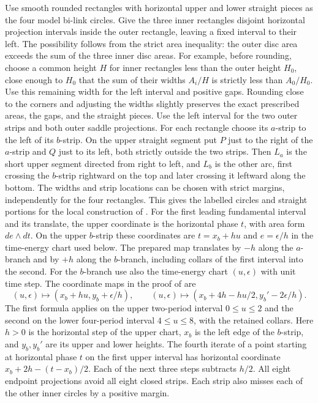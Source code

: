 \documentclass[11pt]{article}
\begin{document}
Use smooth rounded rectangles with horizontal upper and lower straight pieces as
the four model bi-link circles. Give the three inner rectangles disjoint
horizontal projection intervals inside the outer rectangle, leaving a fixed
interval to their left. The possibility follows from the strict area inequality:
the outer disc area exceeds the sum of the three inner disc areas. For example,
before rounding, choose a common height \(H\) for inner rectangles less than the
outer height \(H_0\), close enough to \(H_0\) that the sum of their widths
\(A_i/H\) is strictly less than \(A_0/H_0\). Use this remaining width for the
left interval and positive gaps. Rounding close to the corners and adjusting the
widths slightly preserves the exact prescribed areas, the gaps, and the straight
pieces. Use the left interval for the two outer strips and both outer saddle
projections. For each rectangle choose its \(a\)-strip to the left of its
\(b\)-strip. On the upper straight segment put \(P\) just to the right of the
\(a\)-strip and \(Q\) just to its left, both strictly outside the two strips.
Then \(L_a\) is the short upper segment directed from right to left, and \(L_b\)
is the other arc, first crossing the \(b\)-strip rightward on the top and later
crossing it leftward along the bottom. The widths and strip locations can be
chosen with strict margins, independently for the four rectangles. This gives
the labelled circles and straight portions for the local construction of
\cite[Lemma 4.5]{BT}. For the first leading fundamental interval and its
translate, the upper coordinate is the horizontal phase \(t\), with area form
 \(de\wedge dt\). On the upper \(b\)-strip these coordinates are
\(t=x_b+hu\) and \(e=\epsilon/h\) in the time-energy chart used below.
The prepared map translates by \(-h\) along the \(a\)-branch
and by \(+h\) along the \(b\)-branch, including collars of the first interval
into the second. For the \(b\)-branch use also the time-energy chart
\((u,\epsilon)\) with unit time step. The coordinate maps in the proof of
\cite[Lemma 4.5]{BT} are \[
 (u,\epsilon)\longmapsto(x_b+hu,y_b+\epsilon/h),\qquad
 (u,\epsilon)\longmapsto(x_b+4h-hu/2,y_b'-2\epsilon/h).
\] The first formula applies on the upper two-period interval \(0\le u\le2\) and
the second on the lower four-period interval \(4\le u\le8\), with the retained
collars. Here \(h>0\) is the horizontal step of the upper chart, \(x_b\) is the
left edge of the \(b\)-strip, and \(y_b,y_b'\) are its upper and lower heights.
The fourth iterate of a point starting at horizontal phase \(t\) on the first
upper interval has horizontal coordinate \(x_b+2h-(t-x_b)/2\). Each of the next
three steps subtracts \(h/2\). All eight endpoint projections avoid all eight
closed strips. Each strip also misses each of the other inner circles by a
positive margin.
\end{document}

